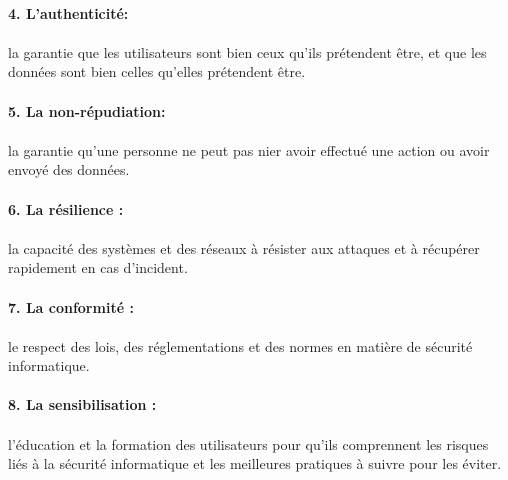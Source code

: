 \paragraph{4. L'authenticité:}  \paragraph{}la garantie que les utilisateurs sont bien ceux qu'ils prétendent être, et que les données sont bien celles qu'elles prétendent être.

\paragraph{5. La non-répudiation: } \paragraph{}la garantie qu'une personne ne peut pas nier avoir effectué une action ou avoir envoyé des données.

\paragraph{6. La résilience :} \paragraph{}la capacité des systèmes et des réseaux à résister aux attaques et à récupérer rapidement en cas d'incident.


\paragraph{7. La conformité :} \paragraph{}le respect des lois, des réglementations et des normes en matière de sécurité informatique.

\paragraph{8. La sensibilisation :}\paragraph{} l'éducation et la formation des utilisateurs pour qu'ils comprennent les risques liés à la sécurité informatique et les meilleures pratiques à suivre pour les éviter.

